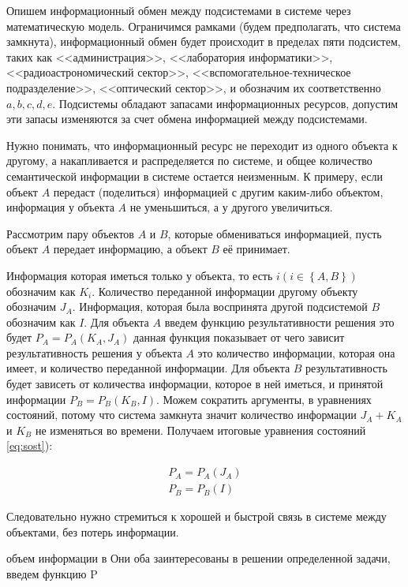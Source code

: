 Опишем информационный обмен между подсистемами в системе через математическую модель. Ограничимся рамками (будем предполагать, что система замкнута), информационный обмен будет  происходит в пределах пяти подсистем, таких как <<администрация>>, <<лаборатория информатики>>, <<радиоастрономический сектор>>, <<вспомогательное-техническое подразделение>>, <<оптический сектор>>, и обозначим их соответственно $a, b, c, d, e$. Подсистемы обладают запасами информационных ресурсов, допустим эти запасы изменяются за счет обмена информацией между подсистемами. 

Нужно понимать, что информационный ресурс не переходит из одного объекта к другому, а накапливается и распределяется по системе, и общее количество семантической информации в системе остается неизменным. К примеру, если объект $A$ передаст (поделиться) информацией с другим каким-либо объектом, информация у объекта $A$ не уменьшиться, а у другого увеличиться.

Рассмотрим пару объектов $A$ и $B$, которые обмениваться информацией, пусть объект $A$ передает информацию, а объект $B$ её принимает.

Информация которая иметься только у объекта, то есть  $i \left( i \in \left\{A,B \right\} \right)$ обозначим как $K_i$. Количество переданной информации другому объекту обозначим $J_A$. Информация, которая была воспринята другой подсистемой $B$ обозначим как $I$. Для объекта $A$ введем функцию результативности решения это будет $P_A=P_A(K_A,J_A)$ данная функция показывает от чего зависит результативность решения у объекта $A$ 	это количество информации, которая она имеет, и количество переданной информации. Для объекта $B$ результативность будет зависеть от количества информации, которое в ней иметься, и принятой информации $P_B=P_B(K_B,I)$. 
Можем сократить аргументы, в уравнениях состояний, потому что система замкнута значит количество информации $J_A+K_A$ и $K_B$ не изменяться во времени. Получаем итоговые уравнения состояний \ref{eq:sost}):

\begin{equation}\label{eq:sost}
\begin{split}
P_A=P_A(J_A) \\
P_B=P_B(I) 
\end{split}
\end{equation}

Следовательно нужно стремиться к хорошей и быстрой связь в системе между объектами, без потерь информации.

 объем информации в Они оба заинтересованы в решении определенной задачи, введем функцию P   

 


\pagebreak